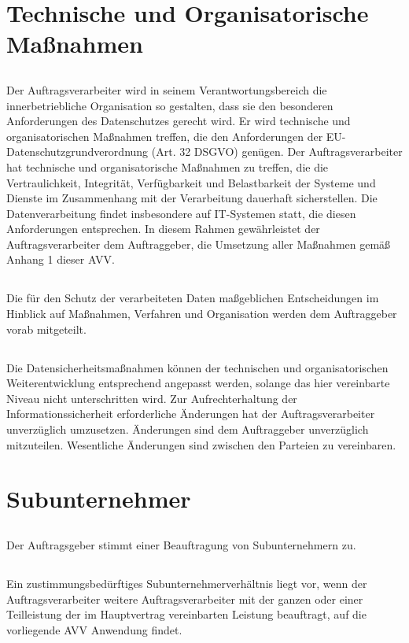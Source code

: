 \documentclass[10pt]{article}
\begin{document}
\section{Technische und Organisatorische Maßnahmen}
\subsection{} Der Auftragsverarbeiter wird in seinem Verantwortungsbereich die innerbetriebliche
Organisation so gestalten, dass sie den besonderen Anforderungen des
Datenschutzes gerecht wird. Er wird technische und organisatorischen Maßnahmen
treffen, die den Anforderungen der EU-Datenschutzgrundverordnung (Art. 32
DSGVO) genügen. Der Auftragsverarbeiter hat technische und organisatorische
Maßnahmen zu treffen, die die Vertraulichkeit, Integrität, Verfügbarkeit und
Belastbarkeit der Systeme und Dienste im Zusammenhang mit der Verarbeitung
dauerhaft sicherstellen. Die Datenverarbeitung findet insbesondere auf IT-Systemen
statt, die diesen Anforderungen entsprechen. In diesem Rahmen gewährleistet der
Auftragsverarbeiter dem Auftraggeber, die Umsetzung aller Maßnahmen gemäß
Anhang 1 dieser AVV.
\subsection{} Die für den Schutz der verarbeiteten Daten maßgeblichen Entscheidungen im
Hinblick auf Maßnahmen, Verfahren und Organisation werden dem Auftraggeber
vorab mitgeteilt.
\subsection{} Die Datensicherheitsmaßnahmen können der technischen und organisatorischen
Weiterentwicklung entsprechend angepasst werden, solange das hier vereinbarte
Niveau nicht unterschritten wird. Zur Aufrechterhaltung der Informationssicherheit
erforderliche Änderungen hat der Auftragsverarbeiter unverzüglich umzusetzen.
Änderungen sind dem Auftraggeber unverzüglich mitzuteilen. Wesentliche
Änderungen sind zwischen den Parteien zu vereinbaren.

\section{Subunternehmer}
\subsection{} Der Auftragsgeber stimmt einer Beauftragung von Subunternehmern zu.
\subsection{} Ein zustimmungsbedürftiges Subunternehmerverhältnis liegt vor, wenn der
Auftragsverarbeiter weitere Auftragsverarbeiter mit der ganzen oder einer
Teilleistung der im Hauptvertrag vereinbarten Leistung beauftragt, auf die
vorliegende AVV Anwendung findet.
\end{document}
